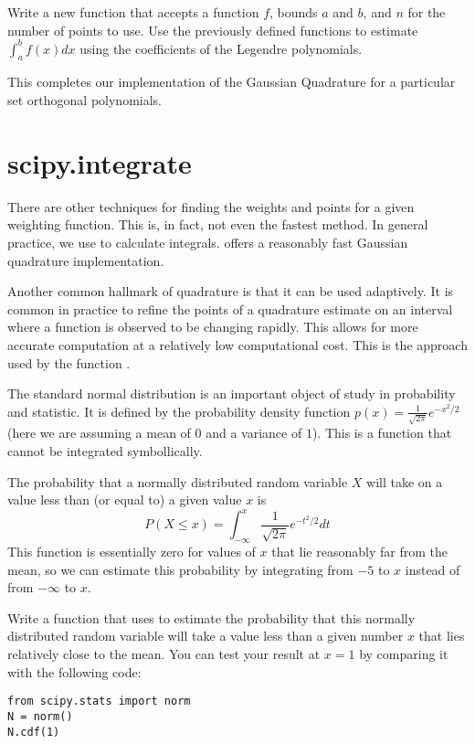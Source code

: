 \begin{problem}
Write a new function that accepts a function $f$, bounds $a$ and $b$, and $n$ for the number of points to use.
Use the previously defined functions to estimate $\int_a^b f(x)dx$ using the coefficients of the Legendre polynomials.

This completes our implementation of the Gaussian Quadrature for a particular set orthogonal polynomials.
\end{problem}

\section*{scipy.integrate}

There are other techniques for finding the weights and points for a given weighting function.
This is, in fact, not even the fastest method.
In general practice, we use  to calculate integrals.
 offers a reasonably fast Gaussian quadrature implementation.

Another common hallmark of quadrature is that it can be used adaptively.
It is common in practice to refine the points of a quadrature estimate on an interval where a function is observed to be changing rapidly.
This allows for more accurate computation at a relatively low computational cost.
This is the approach used by the function .

\begin{problem}
The standard normal distribution is an important object of study in probability and statistic.
It is defined by the probability density function $p(x) = \frac{1}{\sqrt{2 \pi}} e^{-x^2/2}$ (here we are assuming a mean of $0$ and a variance of $1$).
This is a function that cannot be integrated symbollically.

The probability that a normally distributed random variable $X$ will take on a value less than (or equal to) a given value $x$ is
\[P(X \le x) = \int_{-\infty}^x \frac{1}{\sqrt{2 \pi}} e^{-t^2/2} dt\]
This function is essentially zero for values of $x$ that lie reasonably far from the mean, so we can estimate this probability by integrating from $-5$ to $x$ instead of from $-\infty$ to $x$.

Write a function that uses  to estimate the probability that this normally distributed random variable will take a value less than a given number $x$ that lies relatively close to the mean.
You can test your result at $x = 1$ by comparing it with the following code:
\begin{lstlisting}
from scipy.stats import norm
N = norm()
N.cdf(1)
\end{lstlisting}
\end{problem}

\begin{comment}
\section*{Additional Material}

\begin{problem}
Gauss Quadrature with Chebyshev polynomials.
\end{problem}
\end{comment}
